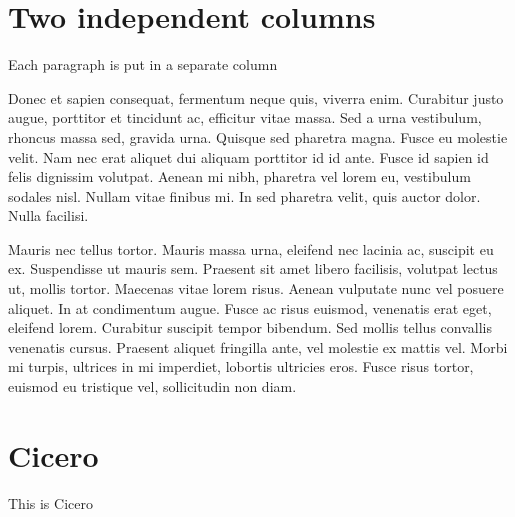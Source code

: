 \documentclass[12pt]{article}
\begin{document}
\newpage

\section{Two independent columns}

Each paragraph is put in a separate column \\

\begin{minipage}[t]{0.45\textwidth}
    Donec et sapien consequat, fermentum neque quis, viverra enim. Curabitur justo augue, porttitor et tincidunt ac, efficitur vitae massa. Sed a urna vestibulum, rhoncus massa sed, gravida urna. Quisque sed pharetra magna. Fusce eu molestie velit. Nam nec erat aliquet dui aliquam porttitor id id ante. Fusce id sapien id felis dignissim volutpat. Aenean mi nibh, pharetra vel lorem eu, vestibulum sodales nisl. Nullam vitae finibus mi. In sed pharetra velit, quis auctor dolor. Nulla facilisi.
\end{minipage}\hfill
\begin{minipage}[t]{0.45\textwidth}
    Mauris nec tellus tortor. Mauris massa urna, eleifend nec lacinia ac, suscipit eu ex. Suspendisse ut mauris sem. Praesent sit amet libero facilisis, volutpat lectus ut, mollis tortor. Maecenas vitae lorem risus. Aenean vulputate nunc vel posuere aliquet. In at condimentum augue. Fusce ac risus euismod,     venenatis erat eget, eleifend lorem. Curabitur suscipit tempor bibendum. Sed mollis tellus convallis venenatis cursus. Praesent aliquet fringilla ante, vel molestie ex mattis vel. Morbi mi turpis, ultrices in mi imperdiet, lobortis ultricies eros. Fusce risus tortor, euismod eu tristique vel, sollicitudin non diam.
\end{minipage}

\newpage

\section{Cicero}

This is Cicero
\end{document}

